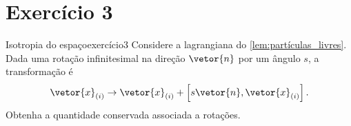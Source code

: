\section*{Exercício 3}
\begin{exercício}{Isotropia do espaço}{exercício3}
    Considere a lagrangiana do \cref{lem:partículas_livres}. Dada uma rotação infinitesimal na direção \(\vetor{n}\) por um ângulo \(s\), a transformação é
    \begin{equation*}
        \vetor{x}_{(i)} \to \vetor{x}_{(i)} + \left[s \vetor{n}, \vetor{x}_{(i)}\right].
    \end{equation*}
    Obtenha a quantidade conservada associada a rotações.
\end{exercício}
